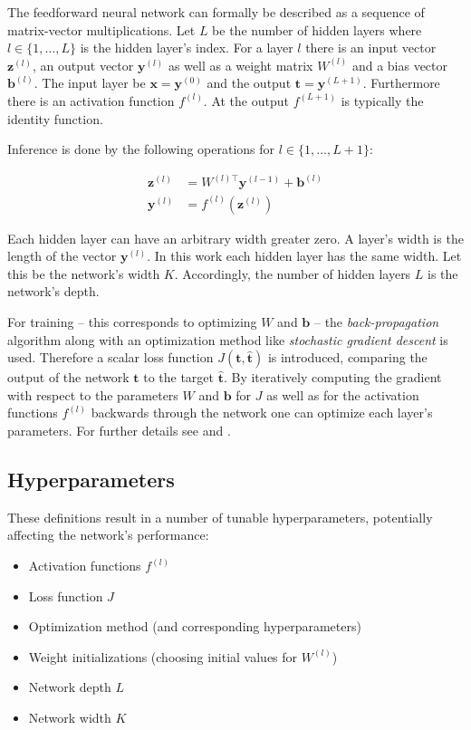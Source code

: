 The feedforward neural network can formally be described as a sequence of matrix-vector multiplications. Let $L$ be the number of hidden layers where $l \in \{1,\dots,L\}$ is the hidden layer's index. For a layer $l$ there is an input vector $\mathbf{z}^{(l)}$, an output vector $\mathbf{y}^{(l)}$ as well as a weight matrix $W^{(l)}$ and a bias vector $\mathbf{b}^{(l)}$. The input layer be $\mathbf{x} = \mathbf{y}^{(0)}$ and the output $\mathbf{t} = \mathbf{y}^{(L+1)}$. Furthermore there is an activation function $f^{(l)}$. At the output $f^{(L+1)}$ is typically the identity function.

Inference is done by the following operations for $l \in \{1,\dots,L+1\}$:

\begin{align}
	\label{eq:layer-input}
	\mathbf{z}^{(l)} &= W^{(l)\top} \mathbf{y}^{(l-1)} + \mathbf{b}^{(l)} \\
	\label{eq:layer-output}
	\mathbf{y}^{(l)} &= f^{(l)}(\mathbf{z}^{(l)})
\end{align}

Each hidden layer can have an arbitrary width greater zero. A layer's width is the length of the vector $\mathbf{y}^{(l)}$. In this work each hidden layer has the same width. Let this be the network's width $K$. Accordingly, the number of hidden layers $L$ is the network's depth.

For training -- this corresponds to optimizing $W$ and $\mathbf{b}$ -- the \emph{back-propagation} algorithm along with an optimization method like \emph{stochastic gradient descent} is used. Therefore a scalar loss function $J(\mathbf{t}, \mathbf{\hat{t}})$ is introduced, comparing the output of the network $\mathbf{t}$ to the target $\mathbf{\hat{t}}$. By iteratively computing the gradient with respect to the parameters $W$ and $\mathbf{b}$ for $J$ as well as for the activation functions $f^{(l)}$ backwards through the network one can optimize each layer's parameters. For further details see \cite{Rumelhart-1986a} and \cite[p.\,204ff.]{Goodfellow-et-al-2016}.

\subsection{Hyperparameters}
\label{sec:hyperparameters}

These definitions result in a number of tunable hyperparameters, potentially affecting the network's performance:
\begin{itemize}
	\item Activation functions $f^{(l)}$
	\item Loss function $J$
	\item Optimization method (and corresponding hyperparameters)
	\item Weight initializations (choosing initial values for $W^{(l)}$)
	\item Network depth $L$
	\item Network width $K$
\end{itemize}

